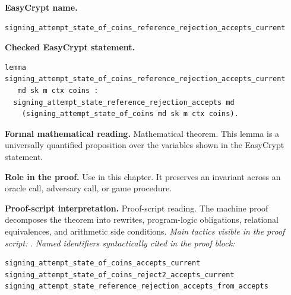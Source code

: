 \begin{formaltheorem}
\noindent\textbf{EasyCrypt name.}
\begin{lstlisting}[language=EasyCrypt,basicstyle=\ttfamily\scriptsize]
signing_attempt_state_of_coins_reference_rejection_accepts_current
\end{lstlisting}
\noindent\textbf{Checked EasyCrypt statement.}
\begin{lstlisting}[language=EasyCrypt,basicstyle=\ttfamily\scriptsize]
lemma signing_attempt_state_of_coins_reference_rejection_accepts_current
   md sk m ctx coins :
  signing_attempt_state_reference_rejection_accepts md
    (signing_attempt_state_of_coins md sk m ctx coins).
\end{lstlisting}
\noindent\textbf{Formal mathematical reading.}
Mathematical theorem. This lemma is a universally quantified proposition over the variables shown in the EasyCrypt statement.

\noindent\textbf{Role in the proof.}
Use in this chapter. It preserves an invariant across an oracle call, adversary call, or game procedure.

\noindent\textbf{Proof-script interpretation.}
Proof-script reading. The machine proof decomposes the theorem into rewrites, program-logic obligations, relational equivalences, and arithmetic side conditions.
\emph{Main tactics visible in the proof script:} .
\emph{Named identifiers syntactically cited in the proof block:}
\begin{lstlisting}[language=EasyCrypt,basicstyle=\ttfamily\scriptsize]
signing_attempt_state_of_coins_accepts_current
signing_attempt_state_of_coins_reject2_accepts_current
signing_attempt_state_reference_rejection_accepts_from_accepts
\end{lstlisting}

\end{formaltheorem}

